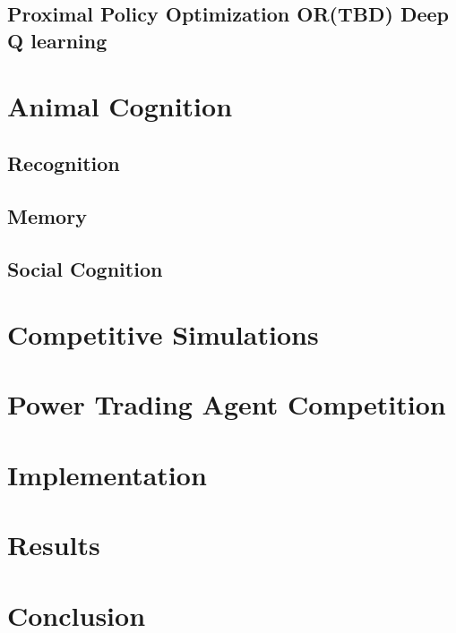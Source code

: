 \section{Proximal Policy Optimization OR(TBD) Deep Q learning}

\chapter{Animal Cognition}
\section{Recognition}
\section{Memory}
\section{Social Cognition}

\chapter{Competitive Simulations}%

\chapter{Power Trading Agent Competition}


\chapter{Implementation}


\chapter{Results}
\chapter{Conclusion}

